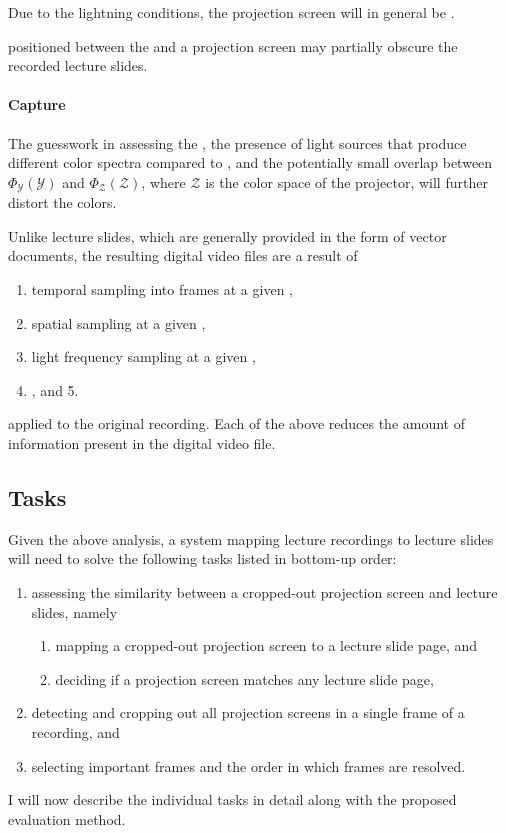 Due to the lightning conditions, the projection screen will in general be
.

 positioned between the  and a projection
screen may partially obscure the recorded lecture slides.

\paragraph{Capture} The guesswork in assessing the ,
the presence of light sources that produce different color spectra compared to
, and the potentially small overlap between $\Phi_{\mathcal
Y}(\mathcal Y)$ and $\Phi_{\mathcal Z}(\mathcal Z)$, where $\mathcal Z$ is the
color space of the projector, will further distort the colors.

Unlike lecture slides, which are generally provided in the form of vector
 documents, the resulting digital video files are a result of
\begin{enumerate}
  \item temporal sampling into frames at a given ,
  \item spatial sampling at a given ,
  \item light frequency sampling at a given ,
  \item {}, and 5. 
\end{enumerate}
applied to the original recording. Each of the above reduces the amount of
information present in the digital video file.

\subsection{Tasks}
\label{sec:tasks}
Given the above analysis, a system mapping lecture recordings to lecture slides
will need to solve the following tasks listed in bottom-up order:
\begin{enumerate}
  \item assessing the similarity between a cropped-out projection screen and
    lecture slides, namely
    \begin{enumerate}
      \item mapping a cropped-out projection screen to a lecture slide page, and
      \item deciding if a projection screen matches any lecture slide page,
    \end{enumerate}
  \item detecting and cropping out all projection screens in a single frame
    of a recording, and
  \item selecting important frames and the order in which frames are resolved.
\end{enumerate}
I will now describe the individual tasks in detail along with the proposed
evaluation method.

